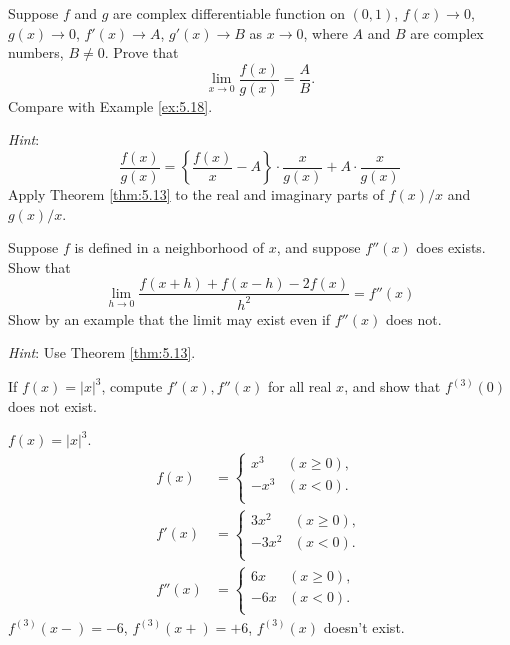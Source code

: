 \begin{myExercise}
    \label{ex:5.10}
    Suppose $f$ and $g$ are complex differentiable function on $(0,1)$,
    $f(x) \rightarrow 0$,
    $g(x) \rightarrow 0$,
    $f'(x) \rightarrow A$,
    $g'(x) \rightarrow B$ 
    as $x \rightarrow 0$,
    where $A$ and $B$ are complex numbers, $B \neq 0$.
    Prove that 
    \begin{equation*}
        \lim_{x \to 0} \frac{f(x)}{g(x)} = \frac{A}{B}.
    \end{equation*}
    Compare with Example \ref{ex:5.18}.

    \emph{Hint}: 
    \begin{equation*}
        \frac{f(x)}{g(x)} = \left\{ \frac{f(x)}{x} - A \right\}\cdot \frac{x}{g(x)} + A \cdot \frac{x}{g(x)}
    \end{equation*}
    Apply Theorem \ref{thm:5.13} to the real and imaginary parts of 
    $f(x)/x$ and $g(x)/x$.
\end{myExercise}


\begin{myExercise}
    \label{ex:5.11}
    Suppose $f$ is defined in a neighborhood of $x$, 
    and suppose $f''(x)$ does exists.
    Show that 
    \begin{equation*}
        \lim_{h \to 0} \frac{f(x+h)+f(x-h)-2f(x)}{h^2} = f''(x)
    \end{equation*}
    Show by an example that the limit may exist even if $f''(x)$ does not.
    
    \emph{Hint}: Use Theorem \ref{thm:5.13}.
\end{myExercise}

\begin{myExercise}
    \label{ex:5.12}
    If $f(x) = |x|^3$, compute $f'(x), f''(x)$ for all real $x$, 
    and show that $f^{(3)}(0)$ does not exist.
\end{myExercise}

\mySolve
$f(x) = |x|^3$.
\begin{align*}
    f(x)  &= 
    \left\{ 
        \begin{array}{ll}
            x^3 & (x\geq 0), \\
            -x^3 & (x < 0). \\
        \end{array}
     \right. \\
    f'(x) &= \left\{ 
        \begin{array}{ll}
            3x^2 & (x\geq 0), \\
            -3x^2 & (x < 0). \\
        \end{array}
     \right. \\
     f''(x) &= \left\{ 
        \begin{array}{ll}
            6x & (x\geq 0), \\
            -6x & (x < 0). \\
        \end{array}
     \right. 
\end{align*}
$f^{(3)}(x-) = -6$,
$f^{(3)}(x+) = +6$,
$f^{(3)}(x)$ doesn't exist.


